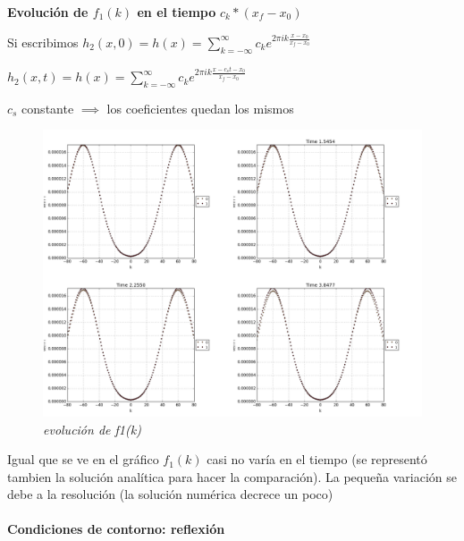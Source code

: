 \documentclass{article}
\begin{document}
\textbf{Evolución de $f_1(k)$ en el tiempo}  $c_k * (x_f - x_0)$
\begin{description}
\item Si escribimos   $h_2(x,0) = h(x) = \sum_{k=-\infty}^{\infty}c_k e^{2 \pi i k \frac{x-x_0}{x_f-x_0}}$ 
\item $h_2(x,t) = h(x) = \sum_{k=-\infty}^{\infty}c_k e^{2 \pi i k \frac{x-c_s t-x_0}{x_f-x_0}}$ 
\item $c_s$ constante $\implies $ los coeficientes quedan los mismos 

\item \begin{figure}[!ht]
 \centering
 \includegraphics[scale=0.2]{fourhom.png}
 \caption{\emph{evolución de f1(k)}}
\end{figure}
\item Igual que se ve en el gráfico $f_1(k) $ casi no varía en el tiempo (se representó tambien la solución analítica para hacer la comparación).
La pequeña variación se debe a la resolución (la solución numérica decrece un poco)


\end{description}

\paragraph{Condiciones de contorno: reflexión}
\end{document}

